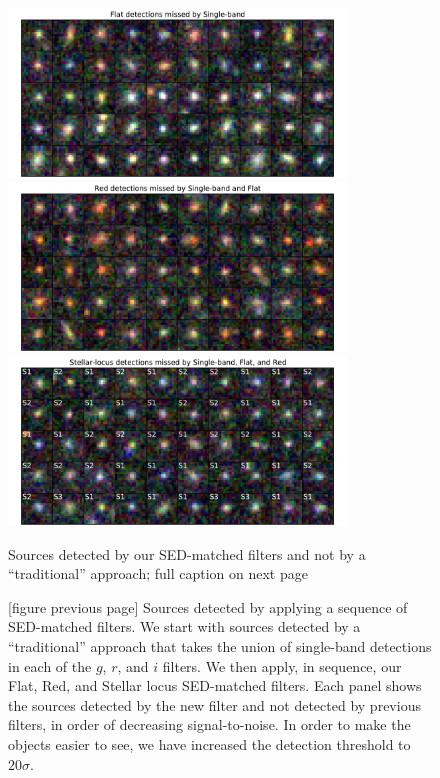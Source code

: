 \documentclass[letterpaper,preprint]{aastex}
\begin{document}
\begin{figure}
\begin{center}
\includegraphics[width=0.8\textwidth]{mdetect-14}
\includegraphics[width=0.8\textwidth]{mdetect-15}
\includegraphics[width=0.8\textwidth]{mdetect-16}
\caption{Sources detected by our SED-matched filters and not by a
  ``traditional'' approach; full caption on next page\label{fig:missed}}
\end{center}
\end{figure}

\addtocounter{figure}{-1}
\begin{figure}
\begin{center}
\caption{[figure previous page] Sources detected by applying a
  sequence of SED-matched filters.  We start with sources detected by
  a ``traditional'' approach that takes the union of single-band
  detections in each of the $g$, $r$, and $i$ filters.  We then apply,
  in sequence, our Flat, Red, and Stellar locus SED-matched filters.
  Each panel shows the sources detected by the new filter and not
  detected by previous filters, in order of decreasing
  signal-to-noise.  In order to make the objects easier to see, we
  have increased the detection threshold to $20 \sigma$.}
\end{center}
\end{figure}
\end{document}
